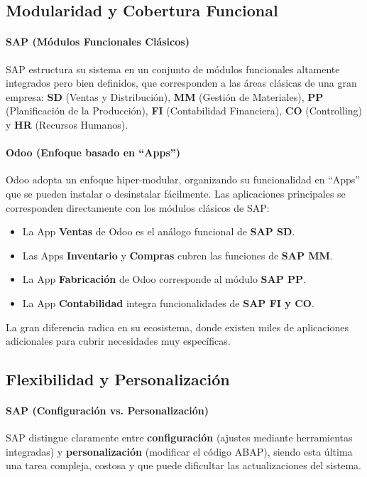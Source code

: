 \documentclass[12pt,letterpaper,spanish]{report}
\begin{document}
\subsection{Modularidad y Cobertura Funcional}

\paragraph{SAP (Módulos Funcionales Clásicos)}
SAP estructura su sistema en un conjunto de módulos funcionales altamente integrados pero bien definidos, que corresponden a las áreas clásicas de una gran empresa: \textbf{SD} (Ventas y Distribución), \textbf{MM} (Gestión de Materiales), \textbf{PP} (Planificación de la Producción), \textbf{FI} (Contabilidad Financiera), \textbf{CO} (Controlling) y \textbf{HR} (Recursos Humanos).

\paragraph{Odoo (Enfoque basado en ``Apps'')}
Odoo adopta un enfoque hiper-modular, organizando su funcionalidad en ``Apps'' que se pueden instalar o desinstalar fácilmente. Las aplicaciones principales se corresponden directamente con los módulos clásicos de SAP:
\begin{itemize}
    \item La App \textbf{Ventas} de Odoo es el análogo funcional de \textbf{SAP SD}.
    \item Las Apps \textbf{Inventario} y \textbf{Compras} cubren las funciones de \textbf{SAP MM}.
    \item La App \textbf{Fabricación} de Odoo corresponde al módulo \textbf{SAP PP}.
    \item La App \textbf{Contabilidad} integra funcionalidades de \textbf{SAP FI y CO}.
\end{itemize}
La gran diferencia radica en su ecosistema, donde existen miles de aplicaciones adicionales para cubrir necesidades muy específicas.

\subsection{Flexibilidad y Personalización}

\paragraph{SAP (Configuración vs. Personalización)}
SAP distingue claramente entre \textbf{configuración} (ajustes mediante herramientas integradas) y \textbf{personalización} (modificar el código ABAP), siendo esta última una tarea compleja, costosa y que puede dificultar las actualizaciones del sistema.
\end{document}

